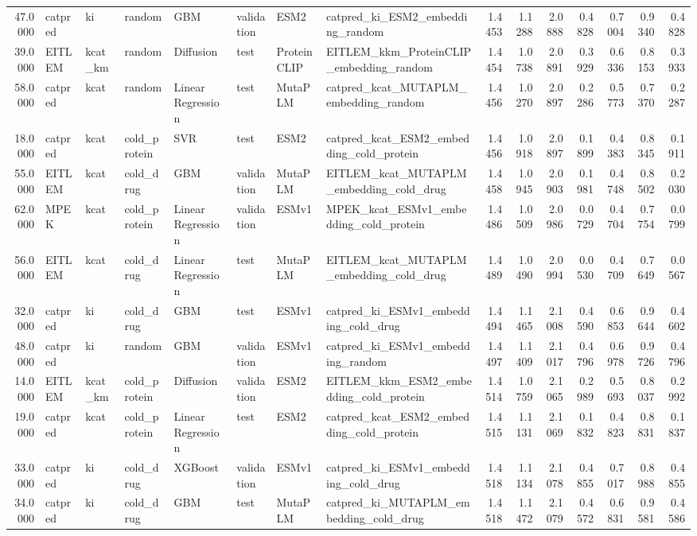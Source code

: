 \begin{tabular}{rlllllllrrrrrrr}
47.0000 & catpred & ki & random & GBM & validation & ESM2 & catpred_ki_ESM2_embedding_random & 1.4453 & 1.1288 & 2.0888 & 0.4828 & 0.7004 & 0.9340 & 0.4828 \\
39.0000 & EITLEM & kcat_km & random & Diffusion & test & ProteinCLIP & EITLEM_kkm_ProteinCLIP_embedding_random & 1.4454 & 1.0738 & 2.0891 & 0.3929 & 0.6336 & 0.8153 & 0.3933 \\
58.0000 & catpred & kcat & random & Linear Regression & test & MutaPLM & catpred_kcat_MUTAPLM_embedding_random & 1.4456 & 1.0270 & 2.0897 & 0.2286 & 0.5773 & 0.7370 & 0.2287 \\
18.0000 & catpred & kcat & cold_protein & SVR & test & ESM2 & catpred_kcat_ESM2_embedding_cold_protein & 1.4456 & 1.0918 & 2.0897 & 0.1899 & 0.4383 & 0.8345 & 0.1911 \\
55.0000 & EITLEM & kcat & cold_drug & GBM & validation & MutaPLM & EITLEM_kcat_MUTAPLM_embedding_cold_drug & 1.4458 & 1.0945 & 2.0903 & 0.1981 & 0.4748 & 0.8502 & 0.2030 \\
62.0000 & MPEK & kcat & cold_protein & Linear Regression & validation & ESMv1 & MPEK_kcat_ESMv1_embedding_cold_protein & 1.4486 & 1.0509 & 2.0986 & 0.0729 & 0.4704 & 0.7754 & 0.0799 \\
56.0000 & EITLEM & kcat & cold_drug & Linear Regression & test & MutaPLM & EITLEM_kcat_MUTAPLM_embedding_cold_drug & 1.4489 & 1.0490 & 2.0994 & 0.0530 & 0.4709 & 0.7649 & 0.0567 \\
32.0000 & catpred & ki & cold_drug & GBM & test & ESMv1 & catpred_ki_ESMv1_embedding_cold_drug & 1.4494 & 1.1465 & 2.1008 & 0.4590 & 0.6853 & 0.9644 & 0.4602 \\
48.0000 & catpred & ki & random & GBM & validation & ESMv1 & catpred_ki_ESMv1_embedding_random & 1.4497 & 1.1409 & 2.1017 & 0.4796 & 0.6978 & 0.9726 & 0.4796 \\
14.0000 & EITLEM & kcat_km & cold_protein & Diffusion & validation & ESM2 & EITLEM_kkm_ESM2_embedding_cold_protein & 1.4514 & 1.0759 & 2.1065 & 0.2989 & 0.5693 & 0.8037 & 0.2992 \\
19.0000 & catpred & kcat & cold_protein & Linear Regression & test & ESM2 & catpred_kcat_ESM2_embedding_cold_protein & 1.4515 & 1.1131 & 2.1069 & 0.1832 & 0.4823 & 0.8831 & 0.1837 \\
33.0000 & catpred & ki & cold_drug & XGBoost & validation & ESMv1 & catpred_ki_ESMv1_embedding_cold_drug & 1.4518 & 1.1134 & 2.1078 & 0.4855 & 0.7017 & 0.8988 & 0.4855 \\
34.0000 & catpred & ki & cold_drug & GBM & test & MutaPLM & catpred_ki_MUTAPLM_embedding_cold_drug & 1.4518 & 1.1472 & 2.1079 & 0.4572 & 0.6831 & 0.9581 & 0.4586 \\

\end{tabular}
